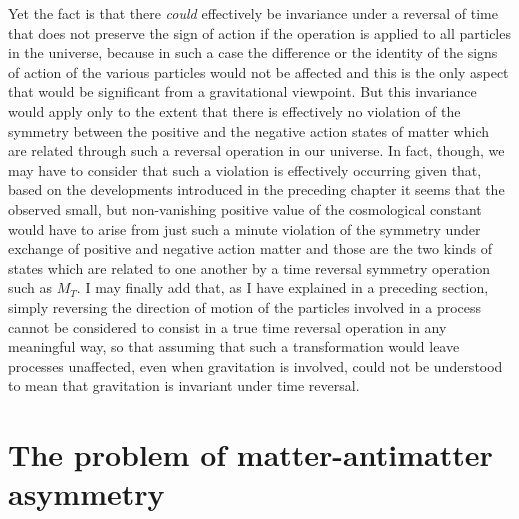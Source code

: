 \documentclass[notitlepage,12pt]{report}
\begin{document}
Yet the fact is that there \textit{could} effectively be invariance under a reversal of time that does not preserve the sign of action if the operation is applied to all particles in the universe, because in such a case the difference or the identity of the signs of action of the various particles would not be affected and this is the only aspect that would be significant from a gravitational viewpoint. But this invariance would apply only to the extent that there is effectively no violation of the symmetry between the positive and the negative action states of matter which are related through such a reversal operation in our universe. In fact, though, we may have to consider that such a violation is effectively occurring given that, based on the developments introduced in the preceding chapter it seems that the observed small, but non-vanishing positive value of the cosmological constant would have to arise from just such a minute violation of the symmetry under exchange of positive and negative action matter and those are the two kinds of states which are related to one another by a time reversal symmetry operation such as $M_T$. I may finally add that, as I have explained in a preceding section, simply reversing the direction of motion of the particles involved in a process cannot be considered to consist in a true time reversal operation in any meaningful way, so that assuming that such a transformation would leave processes unaffected, even when gravitation is involved, could not be understood to mean that gravitation is invariant under time reversal.

\section{The problem of matter-antimatter asymmetry}
\end{document}
